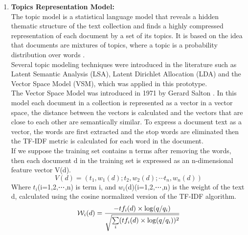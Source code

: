  \begin{enumerate}
	\item \textbf{Topics Representation Model:\\}
	 The topic model is a statistical language model that reveals a hidden thematic structure of the text collection and finds a highly compressed representation of each document by a set of its topics. It is based on the idea that documents are mixtures of topics, where a topic is a probability distribution over words \cite{a:Huang2008} \cite{a:b} \cite{a:Daud2010}.\\ 
	Several topic modeling techniques were introduced in the literature such as Latent Semantic Analysis (LSA), Latent Dirichlet Allocation (LDA) and the Vector Space Model (VSM), which was applied in this prototype.\\
	The Vector Space Model was introduced in 1971 by Gerard Salton \cite{a:vsm}. In this model each document in a collection is represented as a vector in a vector space, the distance between the vectors is calculated and the vectors that are close to each other are semantically similar. 
	To express a document text as a vector, the words are first extracted and the stop words are eliminated then the TF-IDF metric is calculated for each word in the document. \\
	If we suppose the training set contains n terms after removing the words, then each document d in the training set is expressed as an n-dimensional feature vector V(d).
	\begin{equation}
	V(d)=\left(t_{1},w_{1}(d);t_{2},w_{2}(d);\cdots t_{n},w_{n}(d)\right)
	\end{equation}
	Where $t_{i}$(i=1,2,⋯,n) is term i, and $w_{i}$(d)(i=1,2,⋯,n) is the weight of the text d, calculated using the cosine normalized version of the TF-IDF algorithm.
	\begin{equation}
		{\cal W}_{i}(d)={-tf_{i}(d)\times\log({q}/q_{i})\over \sqrt{\sum\limits_{i}(tf_{i}(d)\times\log(q/q_{i}))^{2}}}
	\end{equation}
 

\end{enumerate}
